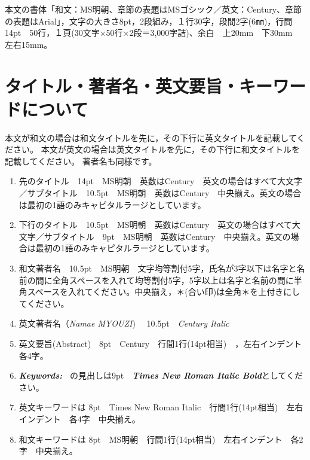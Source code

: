 \documentclass[base=8.8pt,magstyle=real,a4paper,twocolumn,xelatex,pandoc,jafont=ms]{bxjsarticle}
\begin{document}
	本文の書体「和文：MS明朝、章節の表題はMSゴシック／英文：Century、章節の表題はArial」，文字の大きさ8pt，2段組み，１行30字，段間2字(6㎜)，行間14pt　50行，１頁(30文字×50行×2段＝3,000字詰)、余白　上20mm　下30mm　左右15mm。

\section{タイトル・著者名・英文要旨・キーワードについて}
	本文が和文の場合は和文タイトルを先に，その下行に英文タイトルを記載してください。
	本文が英文の場合は英文タイトルを先に，その下行に和文タイトルを記載してください。
	著者名も同様です。
	
	\begin{enumerate}
		\renewcommand{\labelenumi}{$ \textcircled{\scriptsize\arabic{enumi}} $}%
		\item 先のタイトル　14pt　MS明朝　英数はCentury　英文の場合はすべて大文字／サブタイトル　10.5pt　MS明朝　英数はCentury　中央揃え。英文の場合は最初の1語のみキャピタルラージとしています。
		
		\item 下行のタイトル　10.5pt　MS明朝　英数はCentury　英文の場合はすべて大文字／サブタイトル　9pt　MS明朝　英数はCentury　中央揃え。英文の場合は最初の1語のみキャピタルラージとしています。
		
		\item 和文著者名　10.5pt　MS明朝　文字均等割付5字，氏名が3字以下は名字と名前の間に全角スペースを入れて均等割付5字，5字以上は名字と名前の間に半角スペースを入れてください。中央揃え，＊(合い印)は全角＊を上付きにしてください。
		
		\item 英文著者名（\textit{Namae MYOUZI})　 10.5pt　\textit{Century Italic}  
		
		\item 英文要旨(Abstract)　8pt　Century　行間1行(14pt相当)　，左右インデント　各4字。	
		
		\item {\timesnewroman\textit {\textbf{Keywords:~}}} の見出しは9pt　{\timesnewroman\textit {\textbf{Times New Roman Italic Bold}}}としてください。

		\item 英文キーワードは 8pt　Times New Roman Italic　行間1行(14pt相当)　左右インデント　各4字　中央揃え。

		\item 和文キーワードは 8pt　MS明朝　行間1行(14pt相当)　左右インデント　各2字　中央揃え。
		
	\end{enumerate}
\end{document}

